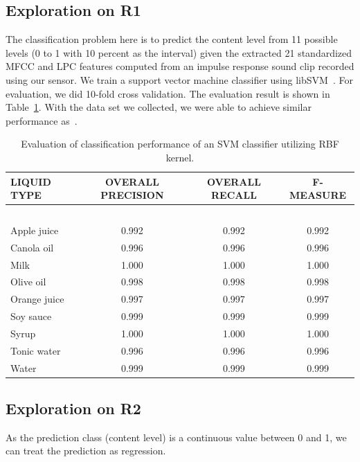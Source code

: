 \documentclass{article} %
\begin{document}
\subsection{Exploration on R1}
The classification problem here is to predict the content level from 11 possible levels (0 to 1 with 10 percent as the interval) given the extracted 21 standardized MFCC and LPC features computed from an impulse response sound clip recorded using our sensor. We train a support vector machine classifier using libSVM~\cite{chang2011libsvm}. For evaluation, we did 10-fold cross validation. The evaluation result is shown in Table~\ref{table:svmEval}. With the data set we collected, we were able to achieve similar performance as~\cite{fan2015soqr}.

\begin{table}[t]
\caption{Evaluation of classification performance of an SVM classifier utilizing RBF kernel.}
\label{table:svmEval}
\begin{center}
\begin{tabular}{ l | c | c | c }
\textbf{LIQUID TYPE} & \textbf{OVERALL PRECISION} & \textbf{OVERALL RECALL} & \textbf{F-MEASURE} \\ \hline
~ & ~ & ~ & ~\\
Apple juice & 0.992 & 0.992 & 0.992 \\
Canola oil & 0.996 & 0.996 & 0.996 \\
Milk & 1.000 & 1.000 & 1.000 \\
Olive oil & 0.998 & 0.998 & 0.998 \\
Orange juice & 0.997 & 0.997 & 0.997 \\
Soy sauce & 0.999 & 0.999 & 0.999 \\
Syrup & 1.000 & 1.000 & 1.000 \\
Tonic water & 0.996 & 0.996 & 0.996 \\
Water & 0.999 & 0.999 & 0.999 \\
\end{tabular}
\end{center}
\end{table}
\subsection{Exploration on R2}
As the prediction class (content level) is a continuous value between 0 and 1, we can treat the prediction as regression.
  
\end{document}
